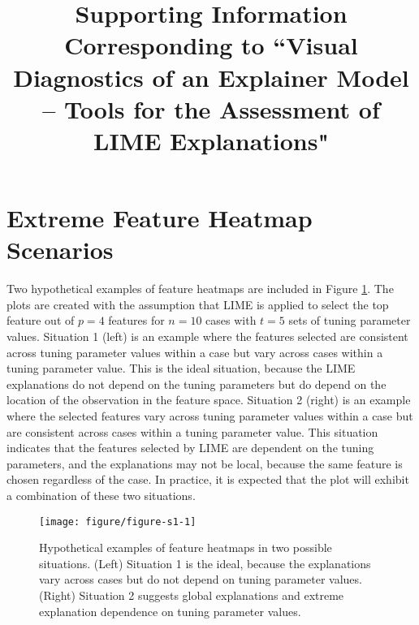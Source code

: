 \documentclass[9pt]{article}\usepackage[]{graphicx}\usepackage[]{color}
\title{Supporting Information Corresponding to ``Visual Diagnostics of an Explainer Model -- Tools for the Assessment of LIME Explanations"}
\date{}
\newenvironment{knitrout}{}{} %
\begin{document}
\maketitle



\section{Extreme Feature Heatmap Scenarios} \label{feat-heat-ex}

Two hypothetical examples of feature heatmaps are included in Figure \ref{fig:figure-s1}. The plots are created with the assumption that LIME is applied to select the top feature out of $p=4$  features for $n=10$ cases with $t=5$ sets of tuning parameter values. Situation 1 (left) is an example where the features selected are consistent across tuning parameter values within a case but vary across cases within a tuning parameter value. This is the ideal situation, because the LIME explanations do not depend on the tuning parameters but do depend on the location of the observation in the feature space. Situation 2 (right) is an example where the selected features vary across tuning parameter values within a case but are consistent across cases within a tuning parameter value. This situation indicates that the features selected by LIME are dependent on the tuning parameters, and the explanations may not be  local, because the same feature is chosen regardless of the case. In practice, it is expected that the plot will exhibit a combination of these two situations.

\vspace{0.5cm}

\renewcommand{\thefigure}{S1}
\begin{figure}[!h]
\begin{knitrout}
\color{fgcolor}

{\centering \texttt{[image: figure/figure-s1-1]} 

}



\end{knitrout}
\caption{Hypothetical examples of feature heatmaps in two possible situations. (Left) Situation 1 is the ideal, because the explanations vary across cases but do not depend on tuning parameter values. (Right) Situation 2 suggests global explanations and extreme explanation dependence on tuning parameter values.}
\label{fig:figure-s1}
\end{figure}
\end{document}

